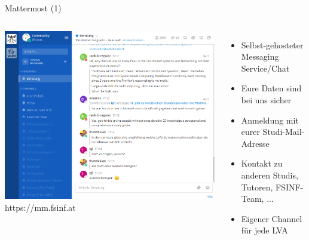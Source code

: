 \documentclass{beamer}
\begin{document}
\begin{frame}{Mattermost (1)}
  \begin{columns}
      \centering
      \includegraphics[width=\textwidth]{mattermost.png}
      https://mm.fsinf.at
      \begin{itemize}
        \item Selbst-gehosteter Messaging Service/Chat
        \item Eure Daten sind bei uns sicher
        \item Anmeldung mit eurer Studi-Mail-Adresse
        \item Kontakt zu anderen Studis, Tutoren, FSINF-Team, ...
        \item Eigener Channel für jede LVA
      \end{itemize}
  \end{columns}
\end{frame}
\end{document}
